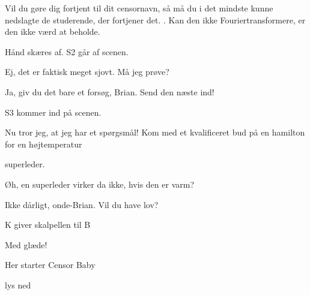 \documentclass[a4paper,11pt]{article}
\begin{document}
\begin{sketch}
 Vil du gøre dig fortjent til dit censornavn, så må du i det mindste kunne nedslagte de studerende, der fortjener det. . Kan den ikke Fouriertransformere, er den ikke værd at beholde.

\scene Hånd skæres af. S2 går af scenen.

 Ej, det er faktisk meget sjovt. Må jeg prøve?

 Ja, giv du det bare et forsøg, Brian. Send den næste ind!

S3 kommer ind på scenen.

 Nu tror jeg, at jeg har et spørgsmål! Kom med et kvalificeret bud på en hamilton for en højtemperatur 

superleder.

 Øh, en superleder virker da ikke, hvis den er varm?

 Ikke dårligt, onde-Brian. Vil du have lov?

\scene K giver skalpellen til B

 Med glæde!


\scene Her starter Censor Baby







\scene lys ned

\end{sketch}
\end{document}
